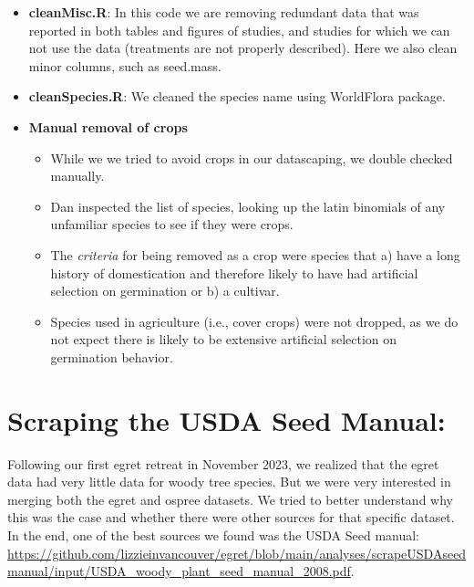 \documentclass{article}[12pt]
\begin{document}
\begin{enumerate}
\begin{itemize}
\begin{itemize}
\end{itemize}
\item \textbf{cleanMisc.R}: In this code we are removing redundant data that was reported in both tables and figures of studies, and studies for which we can not use the data (treatments are not properly described). Here we also clean minor columns, such as seed.mass. 
\item \textbf{cleanSpecies.R}: We cleaned the species name using WorldFlora package.
\end{itemize}
\begin{itemize}
\item\textbf{Manual removal of crops}
\begin{itemize}
\item While we we tried to avoid crops in our datascaping, we double checked manually.
\item Dan inspected the list of species, looking up the latin binomials of any unfamiliar species to see if they were crops.
\item The \emph{criteria} for being removed as a crop were species that a) have a long history of domestication and therefore likely to have had artificial selection on germination or b) a cultivar.
\item Species used in agriculture (i.e., cover crops) were not dropped, as we do not expect there is likely to be extensive artificial selection on germination behavior.
\end{itemize}
\end{itemize}
\end{enumerate}

\section*{Scraping the USDA Seed Manual: }

Following our first egret retreat in November 2023, we realized that the egret data had very little data for woody tree species. But we were very interested in merging both the egret and ospree datasets. We tried to better understand why this was the case and whether there were other sources for that specific dataset. In the end, one of the best sources we found was the USDA Seed manual: \url{https://github.com/lizzieinvancouver/egret/blob/main/analyses/scrapeUSDAseedmanual/input/USDA_woody_plant_seed_manual_2008.pdf}.
\end{document}
